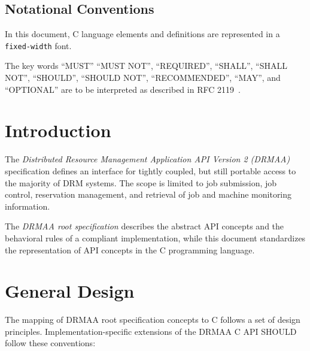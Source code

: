 \documentclass{article}
\newcommand{\h}[1]{\texttt{#1}}
\begin{document}
\subsection*{Notational Conventions}
\label{sec:rfc2119}

In this document, C language elements and definitions are represented in a \h{fixed-width} font. 

The key words \enquote{MUST} \enquote{MUST NOT}, \enquote{REQUIRED}, \enquote{SHALL}, \enquote{SHALL NOT}, \enquote{SHOULD}, \enquote{SHOULD NOT}, \enquote{RECOMMENDED}, \enquote{MAY},  and \enquote{OPTIONAL} are to be interpreted as described in RFC 2119~\cite{rfc2119}. 

\newpage
\tableofcontents
\newpage

\section{Introduction}
\label{sec:introduction}

 The \emph{Distributed Resource Management Application API Version 2 (DRMAA)} specification defines an interface for tightly coupled, but still portable access to the majority of DRM systems. The scope is limited to job submission, job control, reservation management, and retrieval of job and machine monitoring information. 

The \emph{DRMAA root specification} \cite{gfd194} describes the abstract API concepts and the behavioral rules of a compliant implementation, while this document standardizes the representation of API concepts in the C programming language.

\section{General Design}
\label{sec:concepts}

The mapping of DRMAA root specification concepts to C follows a set of design principles. Implementation-specific extensions of the DRMAA C API SHOULD follow these conventions:
\end{document}
